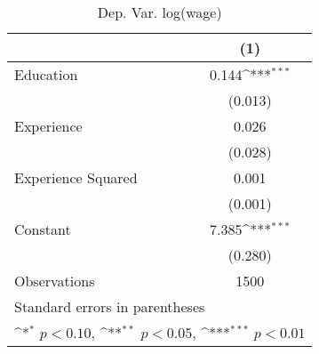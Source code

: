 \begin{table}[htbp]\centering
\def\sym#1{\ifmmode^{#1}\else\(^{#1}\)\fi}
\caption{Dep. Var. log(wage) \label{reg1}}
\begin{tabular}{l*{1}{c}}
\toprule
                    &\multicolumn{1}{c}{(1)}         \\
\midrule
Education           &       0.144\sym{***}\\
                    &     (0.013)         \\
\addlinespace
Experience          &       0.026         \\
                    &     (0.028)         \\
\addlinespace
Experience Squared  &       0.001         \\
                    &     (0.001)         \\
\addlinespace
Constant            &       7.385\sym{***}\\
                    &     (0.280)         \\
\midrule
Observations        &        1500         \\
\bottomrule
\multicolumn{2}{l}{\footnotesize Standard errors in parentheses}\\
\multicolumn{2}{l}{\footnotesize \sym{*} \(p<0.10\), \sym{**} \(p<0.05\), \sym{***} \(p<0.01\)}\\
\end{tabular}
\end{table}

